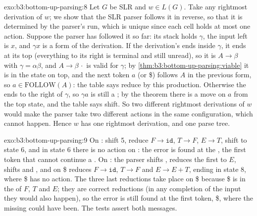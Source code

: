 \begin{solution}{exo:b3:bottom-up-parsing:8}
Let $G$ be SLR and $w \in L(G)$. Take any rightmost derivation of $w$; we show that the SLR parser follows it in reverse, so that it is determined by the parser's run, which is unique since each cell holds at most one action. Suppose the parser has followed it so far: its stack holds $\gamma$, the input left is $x$, and $\gamma x$ is a form of the derivation. If the derivation's  ends inside $\gamma$, it ends at its top (everything to its right is terminal and still unread), so it is $A \to \beta$ with $\gamma = \alpha\beta$, and $A \to \beta\,\cdot$ is valid for $\gamma$; by \cref{thm:b3:bottom-up-parsing:viable} it is in the state on top, and the next token $a$ (or \$) follows $A$ in the previous form, so $a \in \mathrm{FOLLOW}(A)$: the table says reduce by this production. Otherwise the  ends to the right of $\gamma$, so $\gamma a$ is still a ; by the theorem there is a move on $a$ from the top state, and the table says shift. So two different rightmost derivations of $w$ would make the parser take two different actions in the same configuration, which cannot happen. Hence $w$ has one rightmost derivation, and one parse tree.
\end{solution}

\begin{solution}{exo:b3:bottom-up-parsing:9}
On : shift 5, reduce $F \to \mathtt{id}$, $T \to F$, $E \to T$, shift \code{+} to state 6, and in state 6 there is no action on \code{*}: the error is found at the \code{*}, the first token that cannot continue a . On : the parser shifts \code{(}, reduces the first  to $E$, shifts \code{+} and , and on \$ reduces $F \to \mathtt{id}$, $T \to F$ and $E \to E + T$, ending in state 8, where \$ has no action. The three last reductions take place on \$ because \$ is in the  of $F$, $T$ and $E$; they are correct reductions (in any completion of the input they would also happen), so the error is still found at the first token, \$, where the missing \code{)} could have been. The tests assert both messages.
\end{solution}

